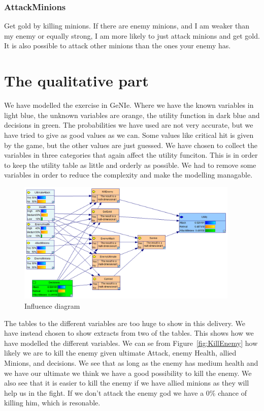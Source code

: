 \documentclass[titlepage]{article}
\begin{document}
\subsubsection*{AttackMinions}
Get gold by killing minions. If there are enemy minions, and I am weaker than my enemy or equally strong, I am more likely to just attack minions and get gold. It is also possible to attack other minions than the ones your enemy has. 


\section{The qualitative part}
We have modelled the exercise in GeNIe. Where we have the known variables in light blue, the unknown variables are orange, the utility function in dark blue and decisions in green. The probabilities we have used are not very accurate, but we have tried to give as good values as we can. Some values like critical hit is given by the game, but the other values are just guessed. We have chosen to collect the variables in three categories that again affect the utility funciton. This is in order to keep the utility table as little and orderly as possible. We had to remove some variables in order to reduce the complexity and make the modelling managable.

\begin{figure}[H]
\label{fig:Influencediagram}
\includegraphics[width=400px]{InfluenceDiagram.PNG}
\caption{Influence diagram}
\end{figure}

The tables to the different variables are too huge to show in this delivery. We have instead chosen to show extracts from two of the tables. This shows how we have modelled the different variables. We can se from Figure~\ref{fig:KillEnemy} how likely we are to kill the enemy given ultimate Attack, enemy Health, allied Minions, and decisions. We see that as long as the enemy has medium health and we have our ultimate we think we have a good possibility to kill the enemy. We also see that it is easier to kill the enemy if we have allied minions as they will help us in the fight. If we don't attack the enemy god we have a 0\% chance of killing him, which is resonable.
\end{document}
